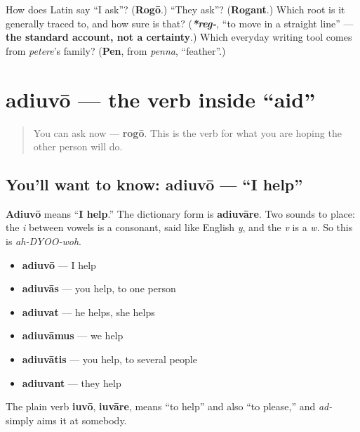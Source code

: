 \begin{tcolorbox}[breakable,colback=teal!4,colframe=teal!35!black,title={Before you move on}]
How does Latin say \textquotedblleft{}I ask\textquotedblright{}? (\textbf{Rogō}.) \textquotedblleft{}They ask\textquotedblright{}? (\textbf{Rogant}.) Which root is it generally traced to, and how sure is that? (\emph{\textbf{*reg-}}, \textquotedblleft{}to move in a straight line\textquotedblright{} — \textbf{the standard account, not a certainty}.) Which everyday writing tool comes from \emph{petere}'s family? (\textbf{Pen}, from \emph{penna}, \textquotedblleft{}feather\textquotedblright{}.)
\end{tcolorbox}
\section[adiuvō, adiuvāre]{adiuvō — the verb inside \textquotedblleft{}aid\textquotedblright{}}

\label{lesson:LA-C39-adiuvo}



\begin{quote}
You can ask now — \textbf{rogō}. This is the verb for what you are hoping the other person will do.
\end{quote}

\subsection*{You'll want to know: adiuvō — \textquotedblleft{}I help\textquotedblright{}}
\textbf{Adiuvō} means \textquotedblleft{}\textbf{I help}.\textquotedblright{} The dictionary form is \textbf{adiuvāre}. Two sounds to place: the \emph{i} between vowels is a consonant, said like English \emph{y}, and the \emph{v} is a \emph{w}. So this is \emph{ah-DYOO-woh}.

\begin{itemize}
\raggedright
  \item \textbf{adiuvō} — I help
  \item \textbf{adiuvās} — you help, to one person
  \item \textbf{adiuvat} — he helps, she helps
  \item \textbf{adiuvāmus} — we help
  \item \textbf{adiuvātis} — you help, to several people
  \item \textbf{adiuvant} — they help
\end{itemize}

The plain verb \textbf{iuvō}, \textbf{iuvāre}, means \textquotedblleft{}to help\textquotedblright{} and also \textquotedblleft{}to please,\textquotedblright{} and \emph{ad-} simply aims it at somebody.

